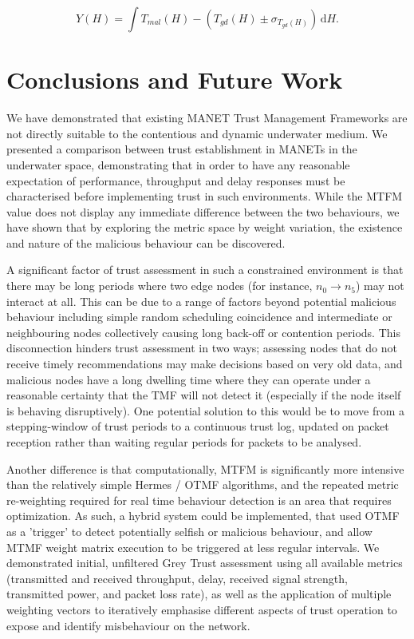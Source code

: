 \documentclass[conference]{IEEEtran}
\begin{document}
\begin{equation}
  Y(H) = \int \! T_{mal}(H) - (T_{gd}(H)\pm\sigma_{T_{gd}(H)})\, \mathrm{d}H.
  \label{eq:regression_target}
\end{equation}

\section{Conclusions and Future Work}
We have demonstrated that existing MANET Trust Management Frameworks are not directly suitable to the contentious and dynamic underwater medium.
We presented a comparison between trust establishment in MANETs in the underwater space, demonstrating that in order to have any reasonable expectation of performance, throughput and delay responses must be characterised before implementing trust in such environments. 
While the MTFM value does not display any immediate difference between the two behaviours, we have shown that by exploring the metric space by weight variation, the existence and nature of the malicious behaviour can be discovered.

A significant factor of trust assessment in such a constrained environment is that there may be long periods where two edge nodes (for instance, $n_0 \to n_5$) may not interact at all. 
This can be due to a range of factors beyond potential malicious behaviour including simple random scheduling coincidence and intermediate or neighbouring nodes collectively causing long back-off or contention periods.
This disconnection hinders trust assessment in two ways; assessing nodes that do not receive timely recommendations may make decisions based on very old data, and malicious nodes have a long dwelling time where they can operate under a reasonable certainty that the TMF will not detect it (especially if the node itself is behaving disruptively).
One potential solution to this would be to move from a stepping-window of trust periods to a continuous trust log, updated on packet reception rather than waiting regular periods for packets to be analysed.

Another difference is that computationally, MTFM is significantly more intensive than the relatively simple Hermes / OTMF algorithms, and the repeated metric re-weighting required for real time behaviour detection is an area that requires optimization. 
As such, a hybrid system could be implemented, that used OTMF as a 'trigger' to detect potentially selfish or malicious behaviour, and allow MTMF weight matrix execution to be triggered at less regular intervals.
We demonstrated initial, unfiltered Grey Trust assessment using all available metrics (transmitted and received throughput, delay, received signal strength, transmitted power, and packet loss rate), as well as the application of multiple weighting vectors to iteratively emphasise different aspects of trust operation to expose and identify misbehaviour on the network.
\end{document}
